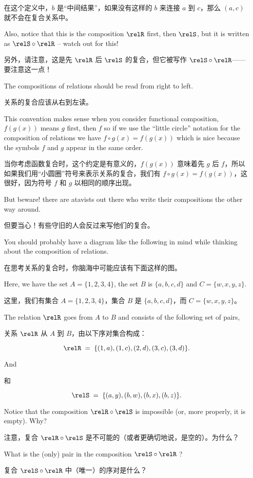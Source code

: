 在这个定义中，$b$ 是“中间结果”，如果没有这样的 $b$ 来连接 $a$ 到 $c$，那么 $(a,c)$ 就不会在复合关系中。

Also, notice that this is the composition $\relR$ first, then $\relS$, but
it is written as $\relS \circ \relR$  -- watch out for this!

另外，请注意，这是先 $\relR$ 后 $\relS$ 的复合，但它被写作 $\relS \circ \relR$——要注意这一点！

The 
compositions of relations should be read from right to left.

关系的复合应该从右到左读。

This convention
makes sense when you consider functional composition, $f(g(x))$ means $g$ 
first, then $f$ so if we use the ``little circle'' notation for the
composition of relations we have $f \circ g (x) = f(g(x))$ which is nice
because the symbols $f$ and $g$ appear in the same order.

当你考虑函数复合时，这个约定是有意义的，$f(g(x))$ 意味着先 $g$ 后 $f$，所以如果我们用“小圆圈”符号来表示关系的复合，我们有 $f \circ g (x) = f(g(x))$，这很好，因为符号 $f$ 和 $g$ 以相同的顺序出现。

But beware! there
are atavists out there who write their compositions the other way around.

但要当心！有些守旧的人会反过来写他们的复合。

You should probably have a diagram like the following in mind while thinking
about the composition of relations.

在思考关系的复合时，你脑海中可能应该有下面这样的图。

Here, we have the set $A=\{1,2,3,4\}$,
the set $B$ is $\{a,b,c,d\}$ and $C=\{w,x,y,z\}$.

这里，我们有集合 $A=\{1,2,3,4\}$，集合 $B$ 是 $\{a,b,c,d\}$，而 $C=\{w,x,y,z\}$。

The relation
$\relR$ goes from $A$ to $B$ and consists of the following set of pairs,

关系 $\relR$ 从 $A$ 到 $B$，由以下序对集合构成：

\[ \relR \; = \;
\{(1,a), (1,c), (2,d), (3,c), (3,d) \}. \]

And 

和

\[ \relS \; = \; \{(a,y), (b,w), (b,x), (b,z) \}.
\]

\vfill



\begin{exer}
Notice that the composition $\relR \circ \relS$ is impossible (or, more
properly, it is empty).  Why?

\begin{exer}
注意，复合 $\relR \circ \relS$ 是不可能的（或者更确切地说，是空的）。为什么？

What is the (only) pair in the composition $\relS \circ \relR$ ?
\end{exer}

复合 $\relS \circ \relR$ 中（唯一）的序对是什么？
\end{exer}

